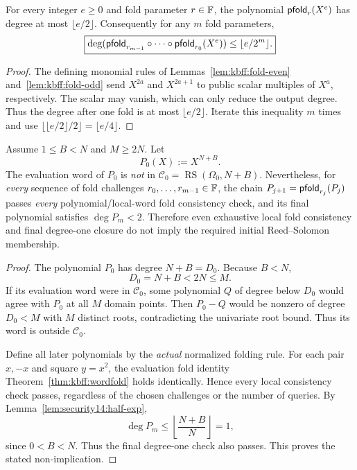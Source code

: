 \begin{lemma}\label{lem:security14:half-exp}
For every integer $e\ge0$
and fold parameter $r\in\mathbb{F}$,
the polynomial $\mathsf{pfold}_r(X^e)$
has degree at most
$\lfloor e/2\rfloor$.
Consequently for any
$m$ fold parameters,
\[
 \boxed{
 \deg(\mathsf{pfold}_{r_{m-1}}\circ\cdots
 \circ\mathsf{pfold}_{r_0}(X^e))
 \le \lfloor e/2^m\rfloor.}
\]
\end{lemma}
\begin{proof}
The defining monomial
rules of
Lemmas~\ref{lem:kbff:fold-even}
and~\ref{lem:kbff:fold-odd}
send $X^{2a}$ and
$X^{2a+1}$ to
public scalar multiples
of $X^a$, respectively.
The scalar may vanish,
which can only reduce
the output degree.
Thus the degree after
one fold is at most
$\lfloor e/2\rfloor$.
Iterate this inequality
$m$ times and use
$\lfloor\lfloor e/2\rfloor/2
\rfloor=\lfloor e/4\rfloor$.
\end{proof}

\begin{theorem}\label{thm:security14:sparse-counterexample}
Assume $1\le B<N$ and
$M\ge2N$.
Let
\[
 \boxed{P_0(X):=X^{N+B}.}
\]
The evaluation word of $P_0$
is \emph{not} in
$\mathcal C_0=\operatorname{RS}
(\Omega_0,N+B)$.
Nevertheless, for \emph{every}
sequence of fold challenges
$r_0,\ldots,r_{m-1}\in\mathbb{F}$,
the chain
$P_{j+1}=\mathsf{pfold}_{r_j}(P_j)$
passes \emph{every}
polynomial/local-word fold
consistency check, and its
final polynomial satisfies
$\deg P_m<2$.
Therefore even exhaustive
local fold consistency
and final degree-one closure
do not imply the required
initial Reed--Solomon
membership.
\end{theorem}
\begin{proof}
The polynomial $P_0$ has
degree $N+B=D_0$.
Because $B<N$,
\[
 D_0=N+B<2N\le M.
\]
If its evaluation word
were in $\mathcal C_0$,
some polynomial $Q$
of degree below $D_0$
would agree with $P_0$
at all $M$ domain points.
Then $P_0-Q$ would be
nonzero of degree $D_0<M$
with $M$ distinct roots,
contradicting the univariate
root bound. Thus its word
is outside $\mathcal C_0$.

Define all later polynomials
by the \emph{actual}
normalized folding rule.
For each pair
$x,-x$ and square
$y=x^2$, the evaluation
fold identity
Theorem~\ref{thm:kbff:wordfold}
holds identically.
Hence every local
consistency check passes,
regardless of the chosen
challenges or the number
of queries.
By
Lemma~\ref{lem:security14:half-exp},
\[
 \deg P_m
 \le\left\lfloor
      \frac{N+B}{N}
    \right\rfloor=1,
\]
since $0<B<N$.
Thus the final degree-one
check also passes.
This proves the stated
non-implication.
\end{proof}

